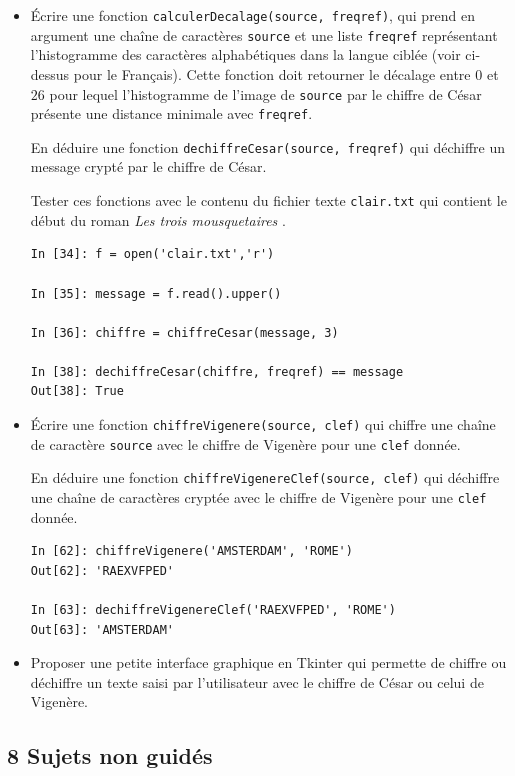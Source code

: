 \documentclass[a4paper, french, 12pt]{article}  %
\newcounter{act}
\begin{document}
\begin{itemize}[label=]
\item Écrire une fonction \texttt{calculerDecalage(source, freqref)}, qui prend en argument une chaîne de caractères \texttt{source}  et une liste \texttt{freqref} représentant l'histogramme des caractères alphabétiques  dans la langue ciblée (voir ci-dessus pour le Français). Cette fonction doit retourner le décalage entre $0$ et $26$ pour lequel l'histogramme de l'image de \texttt{source} par le chiffre de César présente une distance minimale avec \texttt{freqref}.

En déduire une fonction \texttt{dechiffreCesar(source, freqref)} qui déchiffre un message crypté par le chiffre de César.


Tester ces fonctions avec le contenu du fichier texte \texttt{clair.txt} qui contient le début du roman \og{} \textit{Les trois mousquetaires} \fg{}.

\begin{lstlisting}
In [34]: f = open('clair.txt','r')

In [35]: message = f.read().upper()

In [36]: chiffre = chiffreCesar(message, 3)

In [38]: dechiffreCesar(chiffre, freqref) == message
Out[38]: True
\end{lstlisting}

\item Écrire une fonction \texttt{chiffreVigenere(source, clef)} qui chiffre  une chaîne de caractère \texttt{source} avec le chiffre de Vigenère pour une \texttt{clef} donnée.

En déduire une fonction \texttt{chiffreVigenereClef(source, clef)} qui déchiffre une chaîne de caractères cryptée avec le chiffre de Vigenère pour une \texttt{clef} donnée.

\begin{lstlisting}
In [62]: chiffreVigenere('AMSTERDAM', 'ROME')
Out[62]: 'RAEXVFPED'

In [63]: dechiffreVigenereClef('RAEXVFPED', 'ROME')
Out[63]: 'AMSTERDAM'
\end{lstlisting}


\item Proposer une petite interface graphique en Tkinter qui permette de chiffre ou déchiffre un texte saisi par l'utilisateur  avec le chiffre de César ou celui de Vigenère.

\end{itemize}


\subsection{8 Sujets non guidés}
\end{document}
